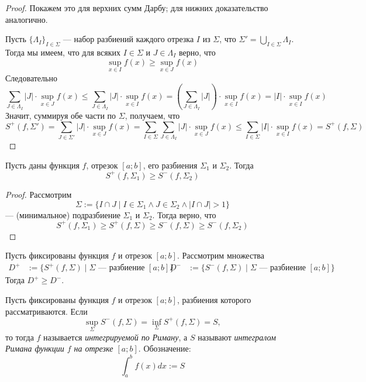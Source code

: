 \documentclass[12pt,a4paper]{article}
\begin{document}
    \begin{proof}
        Покажем это для верхних сумм Дарбу; для нижних доказательство аналогично.

        Пусть $\{\Lambda_I\}_{I \in \Sigma}$ --- набор разбиений каждого отрезка $I$ из $\Sigma$, что $\Sigma' = \bigcup_{I \in \Sigma} \Lambda_I$. Тогда мы имеем, что для всяких $I \in \Sigma$ и $J \in \Lambda_I$ верно, что
        \[\sup_{x \in I} f(x) \geqslant \sup_{x \in J} f(x)\]
        Следовательно
        \[
            \sum_{J \in \Lambda_I} |J| \cdot \sup_{x \in J} f(x)
            \leqslant \sum_{J \in \Lambda_I} |J| \cdot \sup_{x \in I} f(x)
            = \left(\sum_{J \in \Lambda_I} |J|\right) \cdot \sup_{x \in I} f(x)
            = |I| \cdot \sup_{x \in I} f(x)
        \]
        Значит, суммируя обе части по $\Sigma$, получаем, что
        \[
            S^+(f, \Sigma')
            = \sum_{J \in \Sigma'} |J| \cdot \sup_{x \in J} f(x)
            = \sum_{I \in \Sigma} \sum_{J \in \Lambda_I} |J| \cdot \sup_{x \in J} f(x)
            \leqslant \sum_{I \in \Sigma} |I| \cdot \sup_{x \in I} f(x)
            = S^+(f, \Sigma)
        \]
    \end{proof}

    \begin{lemma}
        Пусть даны функция $f$, отрезок $[a; b]$, его разбиения $\Sigma_1$ и $\Sigma_2$. Тогда
        \[S^+(f, \Sigma_1) \geqslant S^-(f, \Sigma_2)\]
    \end{lemma}

    \begin{proof}
        Рассмотрим
        \[\Sigma := \{I \cap J \mid I \in \Sigma_1 \wedge J \in \Sigma_2 \wedge |I \cap J| > 1\}\]
        --- (минимальное) подразбиение $\Sigma_1$ и $\Sigma_2$. Тогда верно, что
        \[S^+(f, \Sigma_1) \geqslant S^+(f, \Sigma) \geqslant S^-(f, \Sigma) \geqslant S^-(f, \Sigma_2)\]
    \end{proof}

    \begin{corollary}
        Пусть фиксированы функция $f$ и отрезок $[a; b]$. Рассмотрим множества
        \begin{align*}
            D^+ &:= \{S^+(f, \Sigma) \mid \text{$\Sigma$ --- разбиение $[a; b]$}\}&
            D^- &:= \{S^-(f, \Sigma) \mid \text{$\Sigma$ --- разбиение $[a; b]$}\}
        \end{align*}
        Тогда $D^+ \geqslant D^-$.
    \end{corollary}

    \begin{definition}
        Пусть фиксированы функция $f$ и отрезок $[a; b]$, разбиения которого рассматриваются. Если
        \[\sup_{\Sigma} S^-(f, \Sigma) = \inf_{\Sigma} S^+(f, \Sigma) = S,\]
        то тогда $f$ называется \emph{интегрируемой по Риману}, а $S$ называют \emph{интегралом Римана функции $f$ на отрезке $[a;b]$}. Обозначение:
        \[\int_a^b f(x) dx := S\]
    \end{definition}
\end{document}
